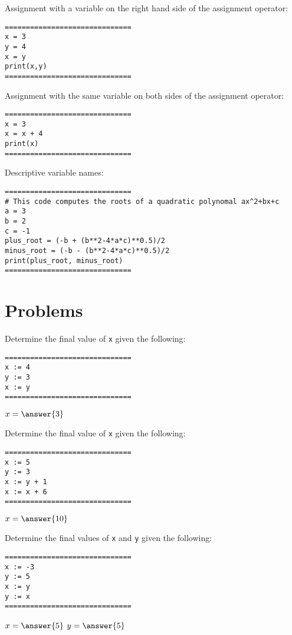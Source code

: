 \documentclass{ximera}
\begin{document}
Assignment with a variable on the right hand side of the assignment operator:

\begin{verbatim}
==============================
x = 3
y = 4
x = y
print(x,y)
==============================
\end{verbatim}

Assignment with the same variable on both sides of the assignment operator:

\begin{verbatim}
==============================
x = 3
x = x + 4
print(x)
==============================
\end{verbatim}

Descriptive variable names:

\begin{verbatim}
==============================
# This code computes the roots of a quadratic polynomal ax^2+bx+c
a = 3
b = 2
c = -1
plus_root = (-b + (b**2-4*a*c)**0.5)/2
minus_root = (-b - (b**2-4*a*c)**0.5)/2
print(plus_root, minus_root)
==============================
\end{verbatim}

\section{Problems}

\begin{question}
	Determine the final value of \verb|x| given the following:
	\begin{verbatim}
==============================
x := 4
y := 3
x := y
==============================
	\end{verbatim}
	$x = \answer{3}$
\end{question}

\begin{question}
	Determine the final value of \verb|x| given the following:
	\begin{verbatim}
==============================
x := 5
y := 3
x := y + 1
x := x + 6
==============================
	\end{verbatim}   
	$x = \answer{10}$
\end{question}

\begin{question}
	Determine the final values of \verb|x| and \verb|y| given the following:
	\begin{verbatim}
==============================
x := -3
y := 5
x := y
y := x
==============================
	\end{verbatim}
	$x = \answer{5}$
	$y = \answer{5}$
\end{question}
\end{document}
